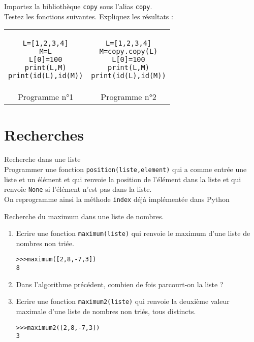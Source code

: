 \begin{exercice}
Importez la bibliothèque \verb?copy? sous l'alias \verb?copy?.\\
Testez les fonctions suivantes. Expliquez les résultats :
\begin{center}
\begin{tabular}{cc}
\begin{minipage}{7cm}
\begin{verbatim}
L=[1,2,3,4]
M=L
L[0]=100
print(L,M)
print(id(L),id(M))
\end{verbatim} 
\end{minipage} &
\begin{minipage}{7cm}
\begin{verbatim}
L=[1,2,3,4]
M=copy.copy(L)
L[0]=100
print(L,M)
print(id(L),id(M))
\end{verbatim}        
\end{minipage}\\
Programme n°1&Programme n°2
\end{tabular}
\end{center}
\end{exercice}







\section{Recherches}


\begin{exercice}Recherche dans une liste\\
Programmer une fonction \verb?position(liste,element)? qui a comme entrée une liste et un élément et qui renvoie la position de l'élément dans la liste et qui renvoie \verb?None? si l'élément n'est pas dans la liste.\\
On reprogramme ainsi la méthode \verb?index? déj\` a implémentée dans Python
\end{exercice}


\begin{exercice}Recherche du maximum dans une liste de nombres.
\begin{enumerate}
\item Ecrire une fonction \verb?maximum(liste)? qui renvoie le maximum d'une liste de nombres non triée.
\begin{verbatim}
>>>maximum([2,8,-7,3])
8
\end{verbatim}
\item Dans l'algorithme précédent, combien de fois parcourt-on la liste ? 
\item Ecrire une fonction \verb?maximum2(liste)? qui renvoie la deuxième valeur maximale d'une liste de nombres non triés, tous distincts.
\begin{verbatim}
>>>maximum2([2,8,-7,3])
3
\end{verbatim}
\end{enumerate}
\end{exercice}

